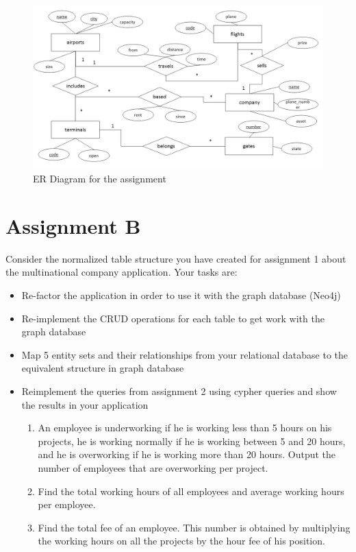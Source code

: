 \documentclass[10pt,a4paper]{article}
\begin{document}
\begin{figure}
	\centering
	\includegraphics[scale = 0.42]{img/erd_assignment3}
	\caption{ER Diagram for the assignment}
	\label{fig:erd}
\end{figure}

\section*{Assignment B}

Consider the normalized table structure you have created for assignment 1 about the multinational company application. Your tasks are:
\begin{itemize}
\item  	Re-factor the application in order to use it with the graph database (Neo4j)
\item 	Re-implement the CRUD operations for each table to get work with the graph database
\item  	Map 5 entity sets and their relationships from your relational database to the equivalent structure in graph database 
\item Reimplement the queries from assignment 2 using cypher queries and show the results in your application
\begin{enumerate}
	\item An employee is underworking if he is working less than 5 hours on his projects, he is working normally if he is working between 5 and 20 hours, and he is overworking if he is working more than 20 hours. Output the number of employees that are overworking per project.
	\item Find the total working hours of all employees and average working hours per employee.
	\item Find the total fee of an employee. This number is obtained by multiplying the working hours on all the projects by the hour fee of his position.
\end{enumerate}
\end{itemize}
\end{document}

